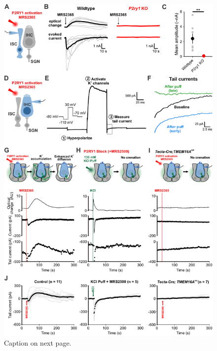 \documentclass[9pt,lineno]{elife}
\begin{document}
\begin{figure}
\begin{fullwidth}
\begin{center}
\includegraphics[width=.75\linewidth]{figures/Fig4.pdf}
\caption{Caption on next page.}
\label{fig:f4}
\end{center}
\end{fullwidth}
\end{figure}
\end{document}
